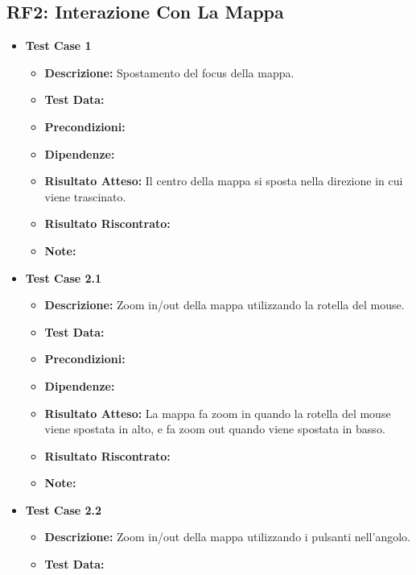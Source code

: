     \subsection{RF2: Interazione Con La Mappa}
        \begin{itemize}
            \item \textbf{Test Case 1}
                \begin{itemize}
                    \item \textbf{Descrizione:} Spostamento del focus della mappa.
                    \item \textbf{Test Data:}
                    \item \textbf{Precondizioni:} 
                    \item \textbf{Dipendenze:}
                    \item \textbf{Risultato Atteso:} Il centro della mappa si sposta nella direzione in cui viene trascinato.
                    \item \textbf{Risultato Riscontrato:}
                    \item \textbf{Note:}
                \end{itemize}
            \item \textbf{Test Case 2.1}
                \begin{itemize}
                    \item \textbf{Descrizione:} Zoom in/out della mappa utilizzando la rotella del mouse.
                    \item \textbf{Test Data:}
                    \item \textbf{Precondizioni:} 
                    \item \textbf{Dipendenze:}
                    \item \textbf{Risultato Atteso:} La mappa fa zoom in quando la rotella del mouse viene spostata in alto, e fa zoom out quando viene spostata in basso.
                    \item \textbf{Risultato Riscontrato:}
                    \item \textbf{Note:}
                \end{itemize}
            \item \textbf{Test Case 2.2}
                \begin{itemize}
                    \item \textbf{Descrizione:} Zoom in/out della mappa utilizzando i pulsanti nell'angolo.
                    \item \textbf{Test Data:}

\end{itemize}
\end{itemize}
